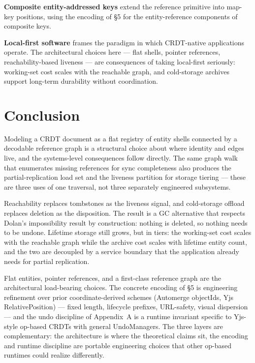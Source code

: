 \textbf{Composite entity-addressed keys}\cite{plexus:keys} extend the reference primitive into map-key positions, using the encoding of \S5 for the entity-reference components of composite keys.

\textbf{Local-first software}\cite{kleppmann2019localfirst} frames the paradigm in which CRDT-native applications operate. The architectural choices here --- flat shells, pointer references, reachability-based liveness --- are consequences of taking local-first seriously: working-set cost scales with the reachable graph, and cold-storage archives support long-term durability without coordination.

\section{Conclusion}

Modeling a CRDT document as a flat registry of entity shells connected by a decodable reference graph is a structural choice about where identity and edges live, and the systems-level consequences follow directly. The same graph walk that enumerates missing references for sync completeness also produces the partial-replication load set and the liveness partition for storage tiering --- these are three uses of one traversal, not three separately engineered subsystems.

Reachability replaces tombstones as the liveness signal, and cold-storage offload replaces deletion as the disposition. The result is a GC alternative that respects Dolan's impossibility result\cite{dolan2020undoable} by construction: nothing is deleted, so nothing needs to be undone. Lifetime storage still grows, but in tiers: the working-set cost scales with the reachable graph while the archive cost scales with lifetime entity count, and the two are decoupled by a service boundary that the application already needs for partial replication.

Flat entities, pointer references, and a first-class reference graph are the architectural load-bearing choices. The concrete encoding of \S5 is engineering refinement over prior coordinate-derived schemes (Automerge objectIds, Yjs RelativePosition) --- fixed length, lifecycle prefixes, URL-safety, visual dispersion --- and the undo discipline of Appendix~A is a runtime invariant specific to Yjs-style op-based CRDTs with general UndoManagers. The three layers are complementary: the architecture is where the theoretical claims sit, the encoding and runtime discipline are portable engineering choices that other op-based runtimes could realize differently.

